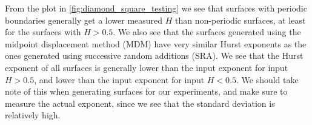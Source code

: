 \begin{figure}[!htb]
\end{figure}%
%

From the plot in \cref{fig:diamond_square_testing} we see that surfaces with periodic boundaries generally get a lower measured $H$ than non-periodic surfaces, at least for the surfaces with $H>0.5$. We also see that the surfaces generated using the midpoint displacement method (MDM) have very similar Hurst exponents as the ones generated using successive random additions (SRA). We see that the Hurst exponent of all surfaces is generally lower than the input exponent for input $H>0.5$, and lower than the input exponent for input $H<0.5$. We should take note of this when generating surfaces for our experiments, and make sure to measure the actual exponent, since we see that the standard deviation is relatively high.%
